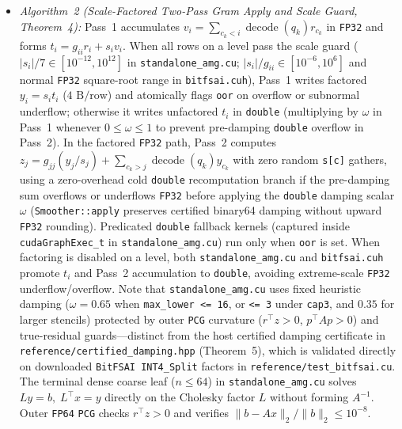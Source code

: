\documentclass[10pt]{article}
\begin{document}
\begin{itemize}
  \item \emph{Algorithm~2 (Scale-Factored Two-Pass Gram Apply and Scale Guard, Theorem~4):} Pass~1 accumulates $v_i = \sum_{c_k < i}\operatorname{decode}(q_k)r_{c_k}$ in \texttt{FP32} and forms $t_i = g_{ii} r_i + s_i v_i$. When all rows on a level pass the scale guard ($|s_i|/7 \in [10^{-12}, 10^{12}]$ in \texttt{standalone\_amg.cu}; $|s_i|/g_{ii} \in [10^{-6}, 10^6]$ and normal \texttt{FP32} square-root range in \texttt{bitfsai.cuh}), Pass~1 writes factored $y_i = s_i t_i$ ($4\text{ B/row}$) and atomically flags \texttt{oor} on overflow or subnormal underflow; otherwise it writes unfactored $t_i$ in \texttt{double} (multiplying by $\omega$ in Pass~1 whenever $0 \le \omega \le 1$ to prevent pre-damping \texttt{double} overflow in Pass~2). In the factored \texttt{FP32} path, Pass~2 computes $z_j = g_{jj}(y_j/s_j) + \sum_{c_k > j}\operatorname{decode}(q_k)y_{c_k}$ with zero random \texttt{s[c]} gathers, using a zero-overhead cold \texttt{double} recomputation branch if the pre-damping sum overflows or underflows \texttt{FP32} before applying the \texttt{double} damping scalar $\omega$ (\texttt{Smoother::apply} preserves certified binary64 damping without upward \texttt{FP32} rounding). Predicated \texttt{double} fallback kernels (captured inside \texttt{cudaGraphExec\_t} in \texttt{standalone\_amg.cu}) run only when \texttt{oor} is set. When factoring is disabled on a level, both \texttt{standalone\_amg.cu} and \texttt{bitfsai.cuh} promote $t_i$ and Pass~2 accumulation to \texttt{double}, avoiding extreme-scale \texttt{FP32} underflow/overflow. Note that \texttt{standalone\_amg.cu} uses fixed heuristic damping ($\omega = 0.65$ when \texttt{max\_lower <= 16}, or \texttt{<= 3} under \texttt{cap3}, and $0.35$ for larger stencils) protected by outer \texttt{PCG} curvature ($r^\top z > 0$, $p^\top A p > 0$) and true-residual guards---distinct from the host certified damping certificate in \texttt{reference/certified\_damping.hpp} (Theorem~5), which is validated directly on downloaded \texttt{BitFSAI INT4\_Split} factors in \texttt{reference/test\_bitfsai.cu}. The terminal dense coarse leaf ($n \le 64$) in \texttt{standalone\_amg.cu} solves $L y = b,\; L^\top x = y$ directly on the Cholesky factor $L$ without forming $A^{-1}$. Outer \texttt{FP64} \texttt{PCG} checks $r^\top z > 0$ and verifies $\|b - A x\|_2/\|b\|_2 \le 10^{-8}$.
\end{itemize}
\end{document}
